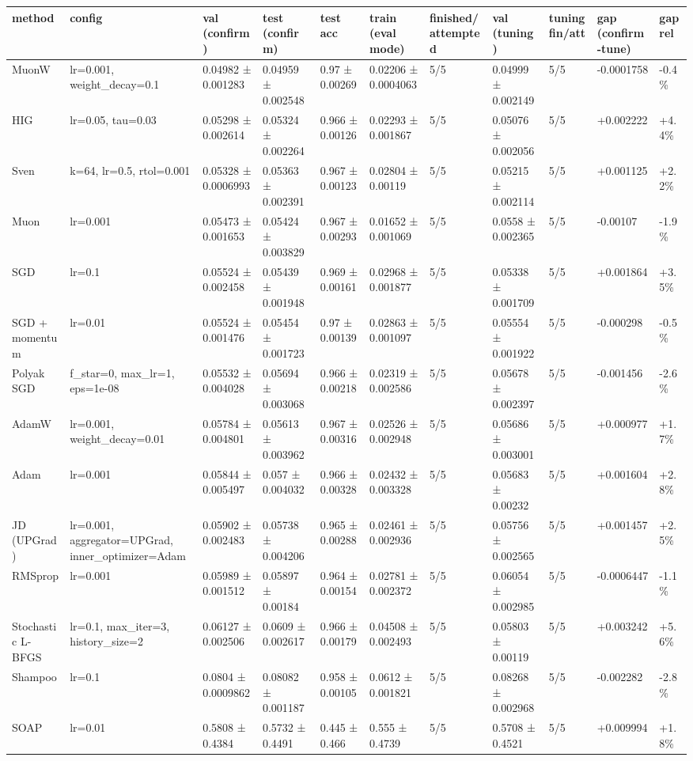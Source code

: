 \begin{tabular}{lllllllllll}
\toprule
method & config & val (confirm) & test (confirm) & test acc & train (eval mode) & finished/attempted & val (tuning) & tuning fin/att & gap (confirm-tune) & gap rel \\
\midrule
MuonW & lr=0.001, weight\_decay=0.1 & 0.04982 ± 0.001283 & 0.04959 ± 0.002548 & 0.97 ± 0.00269 & 0.02206 ± 0.0004063 & 5/5 & 0.04999 ± 0.002149 & 5/5 & -0.0001758 & -0.4\% \\
HIG & lr=0.05, tau=0.03 & 0.05298 ± 0.002614 & 0.05324 ± 0.002264 & 0.966 ± 0.00126 & 0.02293 ± 0.001867 & 5/5 & 0.05076 ± 0.002056 & 5/5 & +0.002222 & +4.4\% \\
Sven & k=64, lr=0.5, rtol=0.001 & 0.05328 ± 0.0006993 & 0.05363 ± 0.002391 & 0.967 ± 0.00123 & 0.02804 ± 0.00119 & 5/5 & 0.05215 ± 0.002114 & 5/5 & +0.001125 & +2.2\% \\
Muon & lr=0.001 & 0.05473 ± 0.001653 & 0.05424 ± 0.003829 & 0.967 ± 0.00293 & 0.01652 ± 0.001069 & 5/5 & 0.0558 ± 0.002365 & 5/5 & -0.00107 & -1.9\% \\
SGD & lr=0.1 & 0.05524 ± 0.002458 & 0.05439 ± 0.001948 & 0.969 ± 0.00161 & 0.02968 ± 0.001877 & 5/5 & 0.05338 ± 0.001709 & 5/5 & +0.001864 & +3.5\% \\
SGD + momentum & lr=0.01 & 0.05524 ± 0.001476 & 0.05454 ± 0.001723 & 0.97 ± 0.00139 & 0.02863 ± 0.001097 & 5/5 & 0.05554 ± 0.001922 & 5/5 & -0.000298 & -0.5\% \\
Polyak SGD & f\_star=0, max\_lr=1, eps=1e-08 & 0.05532 ± 0.004028 & 0.05694 ± 0.003068 & 0.966 ± 0.00218 & 0.02319 ± 0.002586 & 5/5 & 0.05678 ± 0.002397 & 5/5 & -0.001456 & -2.6\% \\
AdamW & lr=0.001, weight\_decay=0.01 & 0.05784 ± 0.004801 & 0.05613 ± 0.003962 & 0.967 ± 0.00316 & 0.02526 ± 0.002948 & 5/5 & 0.05686 ± 0.003001 & 5/5 & +0.000977 & +1.7\% \\
Adam & lr=0.001 & 0.05844 ± 0.005497 & 0.057 ± 0.004032 & 0.966 ± 0.00328 & 0.02432 ± 0.003328 & 5/5 & 0.05683 ± 0.00232 & 5/5 & +0.001604 & +2.8\% \\
JD (UPGrad) & lr=0.001, aggregator=UPGrad, inner\_optimizer=Adam & 0.05902 ± 0.002483 & 0.05738 ± 0.004206 & 0.965 ± 0.00288 & 0.02461 ± 0.002936 & 5/5 & 0.05756 ± 0.002565 & 5/5 & +0.001457 & +2.5\% \\
RMSprop & lr=0.001 & 0.05989 ± 0.001512 & 0.05897 ± 0.00184 & 0.964 ± 0.00154 & 0.02781 ± 0.002372 & 5/5 & 0.06054 ± 0.002985 & 5/5 & -0.0006447 & -1.1\% \\
Stochastic L-BFGS & lr=0.1, max\_iter=3, history\_size=2 & 0.06127 ± 0.002506 & 0.0609 ± 0.002617 & 0.966 ± 0.00179 & 0.04508 ± 0.002493 & 5/5 & 0.05803 ± 0.00119 & 5/5 & +0.003242 & +5.6\% \\
Shampoo & lr=0.1 & 0.0804 ± 0.0009862 & 0.08082 ± 0.001187 & 0.958 ± 0.00105 & 0.0612 ± 0.001821 & 5/5 & 0.08268 ± 0.002968 & 5/5 & -0.002282 & -2.8\% \\
SOAP & lr=0.01 & 0.5808 ± 0.4384 & 0.5732 ± 0.4491 & 0.445 ± 0.466 & 0.555 ± 0.4739 & 5/5 & 0.5708 ± 0.4521 & 5/5 & +0.009994 & +1.8\% \\
\bottomrule
\end{tabular}
